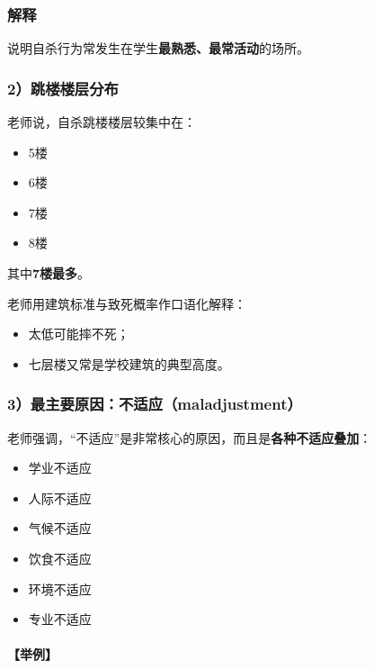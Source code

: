 \documentclass[
  chinese,
  9pt,
  a4paper,
]{ctexart}
\providecommand{\tightlist}{%
  \setlength{\itemsep}{0pt}\setlength{\parskip}{0pt}}
\begin{document}
\subsubsection{解释}\label{ux89e3ux91ca}

说明自杀行为常发生在学生\textbf{最熟悉、最常活动}的场所。

\subsubsection{2）跳楼楼层分布}\label{ux8df3ux697cux697cux5c42ux5206ux5e03}

老师说，自杀跳楼楼层较集中在：

\begin{itemize}
\tightlist
\item
  5楼
\item
  6楼
\item
  7楼
\item
  8楼
\end{itemize}

其中\textbf{7楼最多}。

老师用建筑标准与致死概率作口语化解释：

\begin{itemize}
\tightlist
\item
  太低可能摔不死；
\item
  七层楼又常是学校建筑的典型高度。
\end{itemize}

\subsubsection{3）最主要原因：不适应（maladjustment）}\label{ux6700ux4e3bux8981ux539fux56e0ux4e0dux9002ux5e94maladjustment}

老师强调，``不适应''是非常核心的原因，而且是\textbf{各种不适应叠加}：

\begin{itemize}
\tightlist
\item
  学业不适应
\item
  人际不适应
\item
  气候不适应
\item
  饮食不适应
\item
  环境不适应
\item
  专业不适应
\end{itemize}

\paragraph{【举例】}\label{ux4e3eux4f8b}
\end{document}
